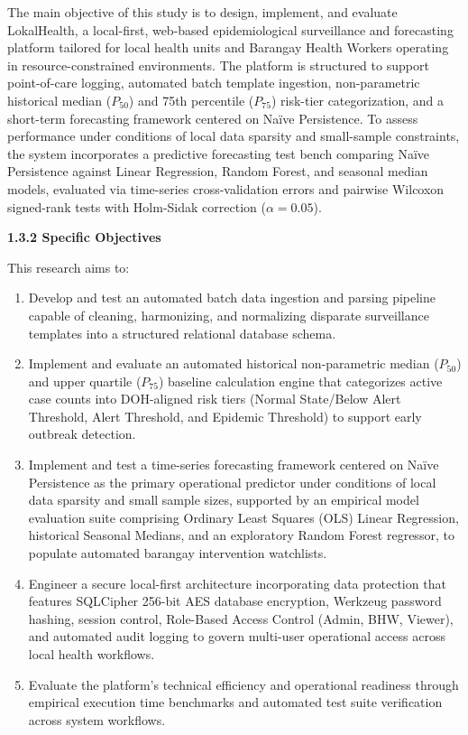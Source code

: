 \documentclass[
]{article}
\begin{document}
The main objective of this study is to design, implement, and evaluate
LokalHealth, a local-first, web-based epidemiological surveillance and
forecasting platform tailored for local health units and Barangay Health
Workers operating in resource-constrained environments. The platform is
structured to support point-of-care logging, automated batch template
ingestion, non-parametric historical median (\(P_{50}\)) and 75th
percentile (\(P_{75}\)) risk-tier categorization, and a short-term
forecasting framework centered on Naïve Persistence. To assess
performance under conditions of local data sparsity and small-sample
constraints, the system incorporates a predictive forecasting test bench
comparing Naïve Persistence against Linear Regression, Random Forest,
and seasonal median models, evaluated via time-series cross-validation
errors and pairwise Wilcoxon signed-rank tests with Holm-Sidak
correction (\(\alpha = 0.05\)).

\textbf{1.3.2 Specific Objectives}

This research aims to:

\begin{enumerate}
\def\labelenumi{\arabic{enumi}.}
\item
  Develop and test an automated batch data ingestion and parsing
  pipeline capable of cleaning, harmonizing, and normalizing disparate
  surveillance templates into a structured relational database schema.
\item
  Implement and evaluate an automated historical non-parametric median
  (\(P_{50}\)) and upper quartile (\(P_{75}\)) baseline calculation
  engine that categorizes active case counts into DOH-aligned risk tiers
  (Normal State/Below Alert Threshold, Alert Threshold, and Epidemic
  Threshold) to support early outbreak detection.
\item
  Implement and test a time-series forecasting framework centered on
  Naïve Persistence as the primary operational predictor under
  conditions of local data sparsity and small sample sizes, supported by
  an empirical model evaluation suite comprising Ordinary Least Squares
  (OLS) Linear Regression, historical Seasonal Medians, and an
  exploratory Random Forest regressor, to populate automated barangay
  intervention watchlists.
\item
  Engineer a secure local-first architecture incorporating data
  protection that features SQLCipher 256-bit AES database encryption,
  Werkzeug password hashing, session control, Role-Based Access Control
  (Admin, BHW, Viewer), and automated audit logging to govern multi-user
  operational access across local health workflows.
\item
  Evaluate the platform's technical efficiency and operational readiness
  through empirical execution time benchmarks and automated test suite
  verification across system workflows.
\end{enumerate}
\end{document}
